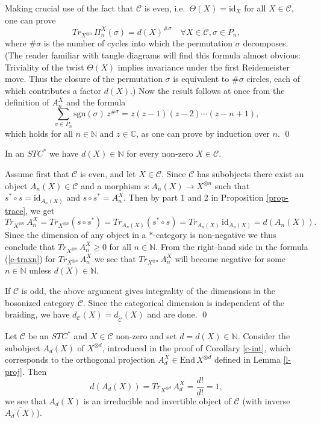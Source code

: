 \documentclass[12pt]{article}
\theoremstyle{definition}
\theoremstyle{definition}
\theoremstyle{remark}
\def\2#1{{\mathcal #1}}
\def\7#1{{\mathbb #1}}
\newcommand{\End}{\mathrm{End}}
\newcommand{\mcirc}{\circ}
\newcommand{\rarr}{\rightarrow}
\def\id{\mathrm{id}}
\begin{document}
 Making crucial use of the fact that $\2C$ is even,
i.e.\ $\Theta(X)=\id_X$ for all $X\in\2C$, one can prove
\[   Tr_{X^{\otimes n}}\,\Pi_n^X(\sigma)= d(X)^{\#\sigma} \quad\forall X\in\2C, \sigma\in P_n, \]
where $\#\sigma$ is the number of cycles into which the permutation $\sigma$ decomposes. (The reader
familiar with tangle diagrams will find this formula almost obvious: Triviality of the twist
$\Theta(X)$ implies invariance under the first Reidemeister move. Thus the closure of the
permutation $\sigma$ is equivalent to $\#\sigma$ circles, each of which contributes a factor $d(X)$.)
Now the result follows at once from the definition of $A_n^X$ and the formula
\[  \sum_{\sigma\in P_n} \mathrm{sgn}(\sigma)\,z^{\#\sigma}=z(z-1)(z-2)\cdots (z-n+1), \]
which holds for all $n\in\7N$ and $z\in\7C$, as one can prove by induction over $n$.
\qed

\bcoro \label{c-int} 
In an $STC^*$ we have $d(X)\in\7N$ for every non-zero $X\in\2C$.
\ecoro 

\prf Assume first that $\2C$ is even, and let $X\in\2C$. Since $\2C$ has subobjects there exist an
object $A_n(X)\in\2C$ and a morphism $s: A_n(X)\rarr X^{\otimes n}$ such that 
$s^*\mcirc  s=\id_{A_n(X)}$ and $s\mcirc  s^*=A^X_n$. Then by part 1 and 2 in Proposition
\ref{prop-trace}, we get 
\[ Tr_{X^{\otimes n}}\,A_n^X = Tr_{X^{\otimes n}}(s\mcirc s^*) =
Tr_{A_n(X)}(s^*\mcirc s) =Tr_{A_n(X)}\,\id_{A_n(X)} = d({A_n(X)}). \]
Since the dimension of any object in a $*$-category is non-negative we
thus conclude that $Tr_{X^{\otimes n}}\,A_n^X\ge 0$ for all $n\in\7N$.
From the right-hand side in the formula (\ref{e-traxn}) for
$Tr_{X^{\otimes n}}\,A_n^X$ we see that $Tr_{X^{\otimes n}}\,A_n^X$
will become negative for some $n\in\7N$ unless $d(X)\in\7N$.

If $\2C$ is odd, the above argument gives integrality of the dimensions in the bosonized category
$\widetilde{\2C}$. Since the categorical dimension is independent of the braiding, we have
$d_\2C(X)=d_{\widetilde{\2C}}(X)$ and are done.
\qed


Let $\2C$ be an $STC^*$ and $X\in\2C$ non-zero and set $d=d(X)\in\7N$. Consider the subobject 
$A_d(X)$ of $X^{\otimes d}$, introduced in the proof of Corollary \ref{c-int}, which corresponds to
the orthogonal projection $A_d^X\in\End\,X^{\otimes d}$ defined in Lemma \ref{l-proj}. Then
\[ d(A_d (X))=Tr_{X^{\otimes d}}\,A_d^X=\frac{d!}{d!}=1 ,\]
we see that $A_d (X)$ is an irreducible and invertible object of $\2C$ (with inverse $\overline{A_d (X)}$).
\end{document}
